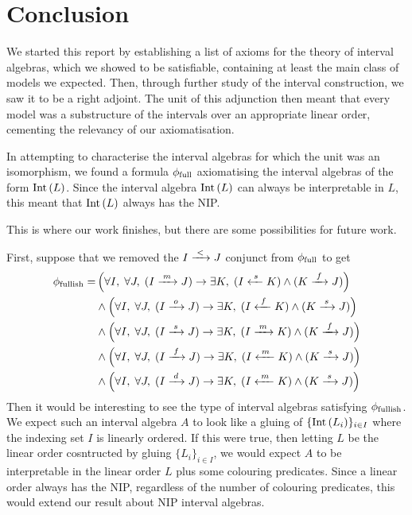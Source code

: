 \section{Conclusion}
\label{sec:conclusion}

We started this report by establishing a list of axioms for the theory of interval algebras, which
we showed to be satisfiable, containing at least the main class of models we expected. Then,
through further study of the interval construction, we saw it to be a right adjoint. The unit of
this adjunction then meant that every model was a substructure of the intervals over an appropriate
linear order, cementing the relevancy of our axiomatisation.

In attempting to characterise the interval algebras for which the unit was an isomorphism, we found
a formula $\allints$ axiomatising the interval algebras of the form $\inter[L]$. Since the interval
algebra $\inter[L]$ can always be interpretable in $L$, this meant that $\inter[L]$ always has the
NIP.

This is where our work finishes, but there are some possibilities for future work.

First, suppose that we removed the $I \before J$ conjunct from $\allints$ to get
\begin{align*}
  \mostints = & \left(\forall I,\; \forall J,\;
        (I \meets J)     \rightarrow \exists K,\; (I \startedby K)  \land (K \finishes J) \right)\\
    & \land \left(\forall I,\; \forall J,\;
        (I \overlaps J)  \rightarrow \exists K,\; (I \finishedby K) \land (K \starts J)   \right)\\
    & \land \left(\forall I,\; \forall J,\;
        (I \starts J)    \rightarrow \exists K,\; (I \meets K)      \land (K \finishes J) \right)\\
    & \land \left(\forall I,\; \forall J,\;
        (I \finishes J)  \rightarrow \exists K,\; (I \metby K)      \land (K \starts J)   \right)\\
    & \land \left(\forall I,\; \forall J,\;
        (I \contained J) \rightarrow \exists K,\; (I \metby K)      \land (K \starts J)   \right)
\end{align*}
Then it would be interesting to see the type of interval algebras satisfying $\mostints$. We expect
such an interval algebra $A$ to look like a gluing of $\{ \inter[L_i] \}_{i \in I}$ where the
indexing set $I$ is linearly ordered. If this were true, then letting $L$ be the linear order
cosntructed by gluing $\{L_i\}_{i \in I}$, we would expect $A$ to be interpretable in the linear
order $L$ plus some colouring predicates. Since a linear order always has the NIP, regardless of the
number of colouring predicates, this would extend our result about NIP interval algebras.

